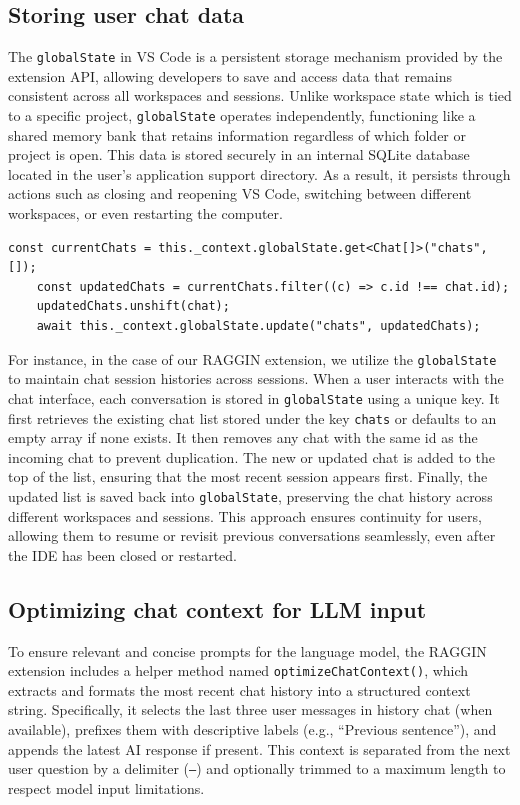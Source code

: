 \subsection{Storing user chat data}
The \texttt{globalState} in VS Code is a persistent storage mechanism provided by the extension API, allowing developers to save and access data that remains consistent across all workspaces and sessions. Unlike workspace state which is tied to a specific project, \texttt{globalState} operates independently, functioning like a shared memory bank that retains information regardless of which folder or project is open. This data is stored securely in an internal SQLite database located in the user's application support directory. As a result, it persists through actions such as closing and reopening VS Code, switching between different workspaces, or even restarting the computer.

\begin{lstlisting}[caption=Handle chat storing]
	const currentChats = this._context.globalState.get<Chat[]>("chats", []);
	const updatedChats = currentChats.filter((c) => c.id !== chat.id);
	updatedChats.unshift(chat);
	await this._context.globalState.update("chats", updatedChats);
\end{lstlisting}

For instance, in the case of our RAGGIN extension, we utilize the \texttt{globalState} to maintain chat session histories across sessions. When a user interacts with the chat interface, each conversation is stored in \texttt{globalState} using a unique key. It first retrieves the existing chat list stored under the key \texttt{chats} or defaults to an empty array if none exists. It then removes any chat with the same id as the incoming chat to prevent duplication. The new or updated chat is added to the top of the list, ensuring that the most recent session appears first. Finally, the updated list is saved back into \texttt{globalState}, preserving the chat history across different workspaces and sessions. This approach ensures continuity for users, allowing them to resume or revisit previous conversations seamlessly, even after the IDE has been closed or restarted.

\subsection{Optimizing chat context for LLM input}
To ensure relevant and concise prompts for the language model, the RAGGIN extension includes a helper method named \texttt{optimizeChatContext()}, which extracts and formats the most recent chat history into a structured context string. Specifically, it selects the last three user messages in history chat (when available), prefixes them with descriptive labels (e.g., “Previous sentence”), and appends the latest AI response if present. This context is separated from the next user question by a delimiter (\texttt{---}) and optionally trimmed to a maximum length to respect model input limitations.

